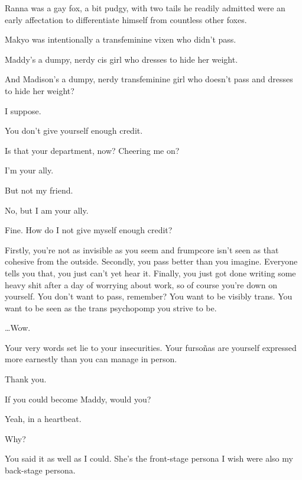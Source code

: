 \begin{paracol}{2}
\begin{leftcolumn}
Ranna was a gay fox, a bit pudgy, with two tails he readily admitted were an early affectation to differentiate himself from countless other foxes.

Makyo was intentionally a transfeminine vixen who didn't pass.

Maddy's a dumpy, nerdy cis girl who dresses to hide her weight.

\begin{ally}
And Madison's a dumpy, nerdy transfeminine girl who doesn't pass and dresses to hide her weight?
\end{ally}
I suppose.

\begin{ally}
You don't give yourself enough credit.
\end{ally}
Is that your department, now? Cheering me on?

\begin{ally}
I'm your ally.
\end{ally}
But not my friend.

\begin{ally}
No, but I am your ally.
\end{ally}
Fine. How do I not give myself enough credit?

\begin{ally}
Firstly, you're not as invisible as you seem and frumpcore isn't seen as that cohesive from the outside. Secondly, you pass better than you imagine. Everyone tells you that, you just can't yet hear it. Finally, you just got done writing some heavy shit after a day of worrying about work, so of course you're down on yourself. You don't want to pass, remember? You want to be visibly trans. You want to be seen as the trans psychopomp you strive to be.
\end{ally}
\ldots{}Wow.

\begin{ally}
Your very words set lie to your insecurities. Your fursoñas are yourself expressed more earnestly than you can manage in person.
\end{ally}
Thank you.

\begin{ally}
If you could become Maddy, would you?
\end{ally}
Yeah, in a heartbeat.

\begin{ally}
Why?
\end{ally}
You said it as well as I could. She's the front-stage persona I wish were also my back-stage persona.


\end{leftcolumn}
\end{paracol}
